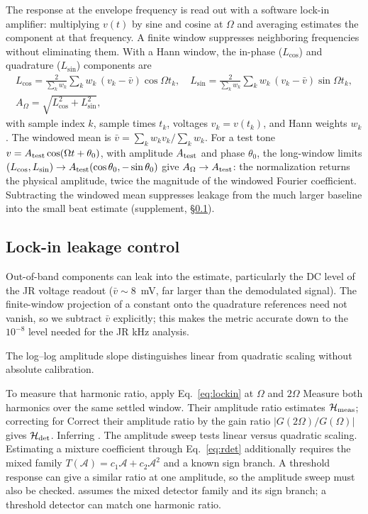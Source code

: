 \documentclass[11pt,a4paper]{article}
\newif\ifjne
\providecommand{\DIFaddtex}[1]{{\protect\color{blue} \sf #1}} %
\providecommand{\DIFdeltex}[1]{{\protect\color{red} \scriptsize #1}} %
\providecommand{\DIFaddbegin}{} %
\providecommand{\DIFaddend}{} %
\providecommand{\DIFdelbegin}{} %
\providecommand{\DIFdelend}{} %
\providecommand{\DIFadd}[1]{\texorpdfstring{\DIFaddtex{#1}}{#1}} %
\providecommand{\DIFdel}[1]{\texorpdfstring{\DIFdeltex{#1}}{}} %
\begin{document}
The response at the envelope frequency is read out with a software lock-in
amplifier: multiplying $v(t)$ by sine and cosine at $\Omega$ and averaging estimates
the component at that frequency. A finite window suppresses neighboring frequencies
without eliminating them. With a Hann window, the in-phase ($L_{\cos}$) and quadrature ($L_{\sin}$)
components are
\begin{equation}
\begin{gathered}
L_{\cos}=\frac{2}{\sum_k w_k}\sum_k w_k\,(v_k-\bar v)\cos\Omega t_k,\quad
L_{\sin}=\frac{2}{\sum_k w_k}\sum_k w_k\,(v_k-\bar v)\sin\Omega t_k,\\
A_\Omega=\sqrt{L_{\cos}^2+L_{\sin}^2},
\end{gathered}
\label{eq:lockin}
\end{equation}
with sample index $k$, sample times $t_k$, voltages $v_k=v(t_k)$,
and Hann weights $w_k$. The windowed mean is
$\bar v=\sum_k w_k v_k/\sum_k w_k$.
For a test tone $v=A_{\rm test}\cos(\Omega t+\theta_0)$, with amplitude
$A_{\rm test}$ and phase $\theta_0$, the long-window limits
$(L_{\cos},L_{\sin})\to A_{\rm test}(\cos\theta_0,-\sin\theta_0)$ give
$A_\Omega\to A_{\rm test}$: the normalization returns the physical amplitude,
twice the magnitude of the windowed Fourier coefficient.
Subtracting the windowed mean suppresses leakage from the much larger baseline
into the small beat estimate (supplement, \S\ref{supp:lockin}).
\ifjne\else
\subsection{Lock-in leakage control}\label{supp:lockin}
Out-of-band components can leak into the estimate, particularly the DC level of the JR voltage readout ($\bar v\!\sim\!8$~mV, far
larger than the demodulated signal). The finite-window projection of a constant onto the quadrature references
need not vanish, so we subtract $\bar v$ explicitly; this makes the metric
accurate down to the $10^{-8}$ level needed for the JR kHz
analysis.

\fi

\DIFdelbegin \DIFdel{The log--log amplitude slope distinguishes linear from quadratic scaling
without absolute calibration.
}%

\DIFdel{To measure that harmonic ratio, apply Eq.~\eqref{eq:lockin} at $\Omega$ and $2\Omega$ }\DIFdelend \DIFaddbegin \DIFadd{Measure both harmonics }\DIFaddend over the same settled window. \DIFdelbegin \DIFdel{Their amplitude
ratio estimates $\mathcal H_{\rm meas}$;
correcting for }\DIFdelend \DIFaddbegin \DIFadd{Correct their amplitude
ratio by the gain ratio }\DIFaddend $|G(2\Omega)/G(\Omega)|$\DIFdelbegin \DIFdel{gives $\mathcal H_{\rm det}$. Inferring }\DIFdelend \DIFaddbegin \DIFadd{. The amplitude sweep tests
linear versus quadratic scaling. Estimating }\DIFaddend a mixture coefficient through
Eq.~\eqref{eq:rdet} \DIFdelbegin \DIFdel{additionally requires the mixed family
$T(\mathcal A)=c_1\mathcal A+c_2\mathcal A^2$ and a known sign branch. A threshold response can give a
similar ratio at one amplitude, so the amplitude sweep must also be checked.
}\DIFdelend \DIFaddbegin \DIFadd{assumes the mixed detector family and its
sign branch; a threshold detector can match one harmonic ratio.
}
\end{document}
